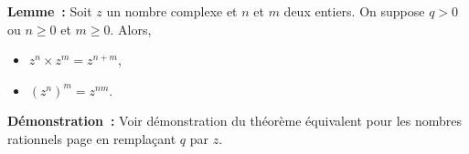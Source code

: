\medskip

\noindent\textbf{Lemme :} Soit $z$ un nombre complexe et $n$ et $m$ deux entiers. 
    On suppose $q > 0$ ou $n \geq 0$ et $m \geq 0$.
    Alors, 
    \begin{itemize}[nosep]
        \item $z^n \times z^m = z^{n+m}$,
        \item $(z^n)^m = z^{n m}$.
    \end{itemize}

\medskip

\noindent\textbf{Démonstration :} Voir démonstration du théorème équivalent pour les nombres rationnels page \pageref{demo:rel_puissances_q} en remplaçant $q$ par $z$.
